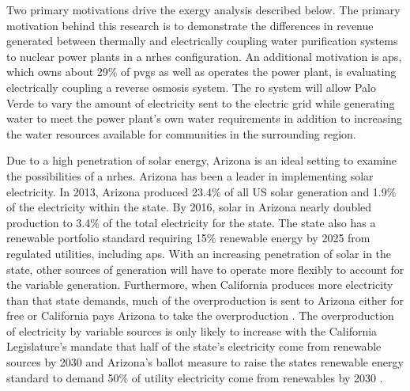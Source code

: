 Two primary motivations drive the exergy analysis described below.  The primary motivation behind this research is to demonstrate the differences in revenue generated between thermally and electrically coupling water purification systems to nuclear power plants in a \ac{nrhes} configuration.   An additional motivation is \ac{aps}, which owns about 29\% of \ac{pvgs} as well as operates the power plant, is evaluating electrically coupling a reverse osmosis system.  The \ac{ro} system will allow Palo Verde to vary the amount of electricity sent to the electric grid while generating water to meet the power plant's own water requirements in addition to increasing the water resources available for communities in the surrounding region.

Due to a high penetration of solar energy, Arizona is an ideal setting to examine the possibilities of a \ac{nrhes}. Arizona has been a leader in implementing solar electricity. In 2013, Arizona produced 23.4\% of all US solar generation and 1.9\% of the electricity within the state.  By 2016, solar in Arizona nearly doubled production to 3.4\% of the total electricity for the state. The state also has a renewable portfolio standard requiring 15\% renewable energy by 2025 from regulated utilities\cite{DSIRE2017}, including \ac{aps}. With an increasing penetration of solar in the state, other sources of generation will have to operate more flexibly to account for the variable generation. Furthermore, when California produces more electricity than that state demands, much of the overproduction is sent to Arizona either for free or California pays Arizona to take the overproduction \cite{Penn2017}. The overproduction of electricity by variable sources is only likely to increase with the California Legislature's mandate that half of the state's electricity come from renewable sources by 2030 \cite{Penn2017} and Arizona's ballot measure to raise the states renewable energy standard to demand 50\% of utility electricity come from renewables by 2030 \cite{Ballotpedia2018}.

